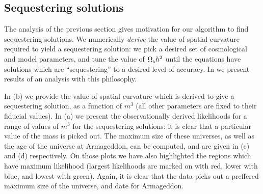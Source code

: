 \documentclass[amsmath,amssymb,10pt,twocolumn,eqsecnum]{revtex4}
\begin{document}
\subsection{Sequestering solutions}
The analysis of the previous section gives motivation for our algorithm to find sequestering solutions. We numerically \textit{derive} the value of spatial curvature required to yield a sequestering solution: we pick a desired set of cosmological and model parameters, and tune the value of ${\Omega}_{\scriptscriptstyle{\textrm{k}}}h^2$ until the equations have solutions which are  ``sequestering'' to a desired level of accuracy. In  we present results of an analysis with this philosophy.

In (b) we provide the value of spatial curvature which is derived to give a sequestering solution, as a function of $m^3$ (all other parameters are fixed to their fiducial values). In (a) we present the observationally derived likelihoods for a range of values of $m^3$ for the sequestering solutions: it is clear that a particular value of the mass is picked out. The maximum size of these universes, as well as the age of the universe at Armageddon, can be computed, and are given in (c) and (d) respectively. On those plots we have also highlighted the regions which have maximum likelihood (largest likelihoods are marked on with red, lower with blue, and lowest with green). Again, it is clear that the data picks out a preffered maximum size of the universe, and date for Armageddon.
\end{document}
